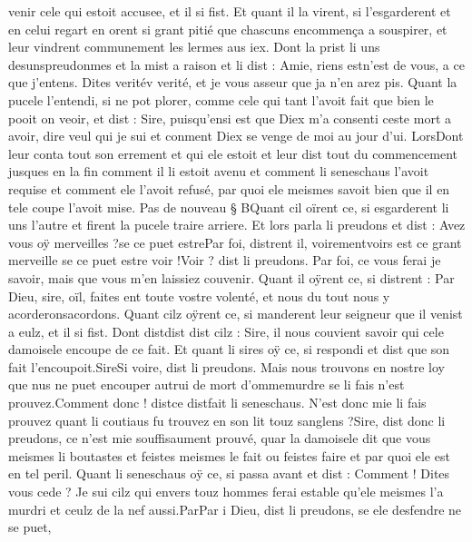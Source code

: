 \documentclass{article}
\begin{document}
\begin{pages}
      venir cele qui estoit accusee, et il si fist. Et quant il la virent, 
   si l’esgarderent et en celui regart en orent 
   si grant pitié que chascuns encommença a souspirer,
   et leur vindrent communement les lermes aus iex.
   Dont la prist 
      li uns desunspreudonmes et la mist a raison et li dist :
   Amie, riens estn'est de vous, a ce que 
      j’entens. Dites veritév verité, 
      et je vous asseur que ja n’en arez pis.
   Quant la pucele l’entendi, si ne pot plorer, comme cele qui tant l’avoit fait que bien le pooit on 
   veoir, et dist :
   Sire, puisqu’ensi est que Diex m’a consenti ceste mort a avoir, dire veul qui je sui et conment Diex 
      se venge de moi au jour d’ui.
   LorsDont leur conta tout son errement et 
      qui ele estoit et leur dist tout du commencement jusques en la fin comment il li estoit avenu et comment 
      li seneschaus l’avoit requise et comment ele l’avoit refusé, 
      par quoi ele meismes savoit bien 
      que il en tele coupe l’avoit mise. \pend
\pstart  Pas de nouveau § BQuant cil oïrent ce, si esgarderent li uns
   l’autre et firent la pucele traire arriere. Et lors parla 
   li preudons et dist : 
   Avez vous oÿ merveilles ?se ce puet estrePar foi, distrent il, voirementvoirs 
      est ce grant merveille se ce puet estre voir !Voir ? dist li preudons. 
      Par foi, ce vous ferai je savoir, mais que vous m'en laissiez couvenir.
   Quant il oÿrent ce, si distrent :
   Par Dieu, sire, oïl, faites ent toute 
      vostre volenté, et nous du tout nous y acorderonsacordons. 
   Quant cilz oÿrent ce, si manderent leur seigneur que
   il venist a eulz, et il si fist. Dont 
   distdist dist cilz :
   Sire, il nous couvient savoir qui cele damoisele encoupe de ce 
      fait. 
   Et quant li sires oÿ ce, si respondi et dist que 
   son fait l’encoupoit.SireSi voire, dist 
      li preudons. Mais nous trouvons en nostre loy que nus ne puet 
      encouper autrui de mort d’ommemurdre se li fais n’est prouvez.Comment donc ! 
      distce distfait
      li seneschaus. N'est donc mie li fais prouvez quant li coutiaus fu trouvez 
      en son lit touz sanglens ?Sire, dist donc li preudons, 
      ce n’est mie souffisaument prouvé, quar la damoisele dit que 
      vous meismes li boutastes et feistes meismes le fait ou feistes faire et par quoi ele est en tel 
         peril. \pend
\pstart Quant li seneschaus oÿ ce, si passa avant et dist :
   Comment ! Dites vous cede ?
      Je sui cilz qui envers touz hommes ferai estable qu’ele meismes l’a murdri et ceulz de la nef
      aussi.ParPar i 
      Dieu, dist li preudons, se ele desfendre ne se puet,

\end{pages}
\end{document}
